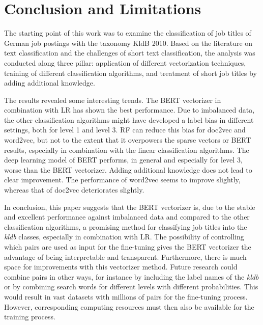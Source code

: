 \documentclass[12pt, a4paper, titlepage]{article}
\begin{document}
\section{Conclusion and Limitations}
The starting point of this work was to examine the classification of job titles of German job postings with the taxonomy \ac{KldB} 2010. Based on the literature on text classification and the challenges of short text classification, the analysis was conducted along three pillar: application of different vectorization techniques, training of different classification algorithms, and treatment of short job titles by adding additional knowledge. 

The results revealed some interesting trends. The \ac{BERT} vectorizer in combination with \ac{LR} has shown the best performance. Due to imbalanced data, the other classification algorithms might have developed a label bias in different settings, both for level 1 and level 3. \ac{RF} can reduce this bias for doc2vec and word2vec, but not to the extent that it overpowers the sparse vectors or BERT results, especially in combination with the linear classification algorithms. The deep learning model of \ac{BERT} performs, in general and especially for level 3, worse than the \ac{BERT} vectorizer. Adding additional knowledge does not lead to clear improvement. The performance of word2vec seems to improve slightly, whereas that of doc2vec deteriorates slightly. 

In conclusion, this paper suggests that the \ac{BERT} vectorizer is, due to the stable and excellent performance against imbalanced data and compared to the other classification algorithms, a promising method for classifying job titles into the \textit{kldb} classes, especially in combination with \ac{LR}. The possibility of controlling which pairs are used as input for the fine-tuning gives the \ac{BERT} vectorizer the advantage of being interpretable and transparent. Furthermore, there is much space for improvements with this vectorizer method. Future research could combine pairs in other ways, for instance by including the label names of the \textit{kldb} or by combining search words for different levels with different probabilities. This would result in vast datasets with millions of pairs for the fine-tuning process. However, corresponding computing resources must then also be available for the training process. 
\end{document}
